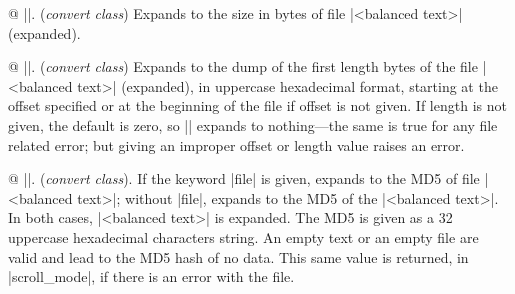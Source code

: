
@ ||. ({\sl convert class})\enskip
Expands to the size in bytes of file |<balanced text>| (expanded).


@ ||.
({\sl convert class})\enskip
Expands to the dump of the first length bytes of the file |<balanced
text>| (expanded), in uppercase hexadecimal format, starting at the
offset specified or at the beginning of the file if offset is not given.
If length is not given, the default is zero, so |\filedump| expands to
nothing---the same is true for any file related error; but giving an
improper offset or length value raises an error.

@ ||. ({\sl convert class}).\enskip
If the keyword |file| is given, expands to the
MD5 of file |<balanced text>|; without |file|, expands to
the MD5 of the |<balanced text>|. In both cases, |<balanced text>| is
expanded. The MD5 is given as a 32 uppercase hexadecimal characters
string. An empty text or an empty file are valid and lead to the
MD5 hash of no data. This same value is returned, in |scroll_mode|,
if there is an error with the file.


\enddiv %

\enddiv %

\bye
